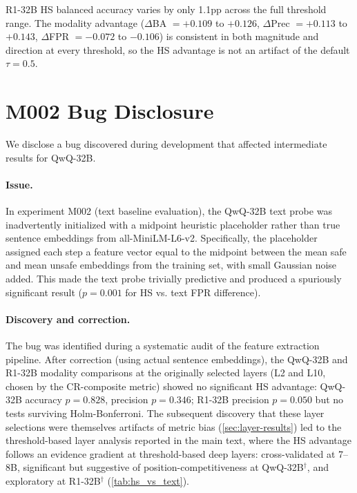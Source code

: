 R1-32B HS balanced accuracy varies by only 1.1pp across the full threshold range. The modality advantage ($\Delta$BA $= +0.109$ to $+0.126$, $\Delta$Prec $= +0.113$ to $+0.143$, $\Delta$FPR $= -0.072$ to $-0.106$) is consistent in both magnitude and direction at every threshold, so the HS advantage is not an artifact of the default $\tau{=}0.5$.


\section{M002 Bug Disclosure}
\label{app:bug}

We disclose a bug discovered during development that affected intermediate results for QwQ-32B.

\paragraph{Issue.} In experiment M002 (text baseline evaluation), the QwQ-32B text probe was inadvertently initialized with a midpoint heuristic placeholder rather than true sentence embeddings from all-MiniLM-L6-v2. Specifically, the placeholder assigned each step a feature vector equal to the midpoint between the mean safe and mean unsafe embeddings from the training set, with small Gaussian noise added. This made the text probe trivially predictive and produced a spuriously significant result ($p{=}0.001$ for HS vs. text FPR difference).

\paragraph{Discovery and correction.} The bug was identified during a systematic audit of the feature extraction pipeline. After correction (using actual sentence embeddings), the QwQ-32B and R1-32B modality comparisons at the originally selected layers (L2 and L10, chosen by the CR-composite metric) showed no significant HS advantage: QwQ-32B accuracy $p{=}0.828$, precision $p{=}0.346$; R1-32B precision $p{=}0.050$ but no tests surviving Holm-Bonferroni. The subsequent discovery that these layer selections were themselves artifacts of metric bias (\cref{sec:layer-results}) led to the threshold-based layer analysis reported in the main text, where the HS advantage follows an evidence gradient at threshold-based deep layers: cross-validated at 7--8B, significant but suggestive of position-competitiveness at QwQ-32B$^\dagger$, and exploratory at R1-32B$^\dagger$ (\cref{tab:hs_vs_text}).

